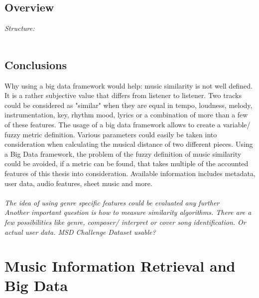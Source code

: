 \section{Overview}

\textit{Structure: \\}
\ \\
\begin{figure}[htbp]
	\centering
\end{figure}

\section{Conclusions}

Why using a big data framework would help: 
music similarity is not well defined. It is a rather subjective value that differs from listener to listener. 
Two tracks could be considered as "similar" when they are equal in tempo, loudness, melody, instrumentation, key, rhythm mood, lyrics or a combination of more than a few of these features. The usage of a big data framework allows to create a variable/ fuzzy metric definition. Various parameters could easily be taken into consideration when calculating the musical distance of two different pieces. 
Using a Big Data framework, the problem of the fuzzy definition of music similarity could be avoided, if a metric can be found, that takes multiple of the accounted features of this thesis into consideration.
Available information includes metadata, user data, audio features, sheet music and more.\\
\textit{\ \\
The idea of using genre specific features could be evaluated any further
\ \\
Another important question is how to measure similarity algorithms. 
There are a few possibilities like genre, composer/ interpret or cover song identification. Or actual user data. MSD Challenge Dataset usable?\cite{msdchallenge1}\\}

\chapter{Music Information Retrieval and Big Data}\label{audiofeat}

